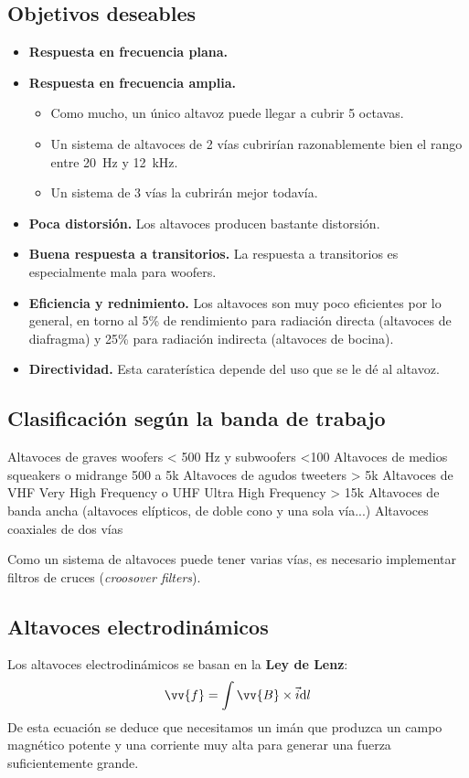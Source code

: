 \documentclass[10pt]{book}
\renewcommand{\vec}{\vv}
\begin{document}
\subsection{Objetivos deseables}
\begin{itemize}
	\item \textbf{Respuesta en frecuencia plana.}
	\item \textbf{Respuesta en frecuencia amplia.}
	      \begin{itemize}
		      \item Como mucho, un único altavoz puede llegar a cubrir 5 octavas.
		      \item Un sistema de altavoces de 2 vías cubrirían razonablemente bien el rango entre \SI{	20}{\hertz} y \SI{12}{\kilo\hertz}.
		      \item Un sistema de 3 vías la cubrirán mejor todavía.
	      \end{itemize}
	\item \textbf{Poca distorsión.} Los altavoces producen bastante distorsión.
	\item \textbf{Buena respuesta a transitorios.} La respuesta a transitorios es especialmente mala para woofers.
	\item \textbf{Eficiencia y rednimiento.} Los altavoces son muy poco eficientes por lo general, en torno al 5\% de rendimiento para radiación directa (altavoces de diafragma) y 25\% para radiación indirecta (altavoces de bocina).
	\item \textbf{Directividad.} Esta caraterística depende del uso que se le dé al altavoz.
\end{itemize}

\subsection{Clasificación según la banda de trabajo}
Altavoces de graves woofers < 500 Hz y subwoofers <100
Altavoces de medios squeakers o midrange 500 a 5k
Altavoces de agudos tweeters > 5k
Altavoces de VHF Very High Frequency o UHF Ultra High Frequency > 15k
Altavoces de banda ancha (altavoces elípticos, de doble cono y una sola vía...)
Altavoces coaxiales de dos vías

Como un sistema de altavoces puede tener varias vías, es necesario implementar filtros de cruces (\textit{croosover filters}).


\subsection{Altavoces electrodinámicos}
Los altavoces electrodinámicos se basan en la \textbf{Ley de Lenz}:
\begin{equation} \label{eq:lenz}
	\vec{f} = \int \vec{B} \times \Vec{i} \dd l
\end{equation}
De esta ecuación se deduce que necesitamos un imán que produzca un campo magnético potente y una corriente muy alta para generar una fuerza suficientemente grande.
\end{document}
